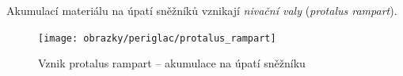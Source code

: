 Akumulací materiálu na úpatí sněžníků vznikají \emph{nivační valy} (\textit{protalus rampart}).
\begin{figure}
	\centering
	\texttt{[image: obrazky/periglac/protalus\_rampart]}
	\caption{Vznik protalus rampart -- akumulace na úpatí sněžníku}
	\label{fig:protalusrampart}
\end{figure}


%		
%
%	

